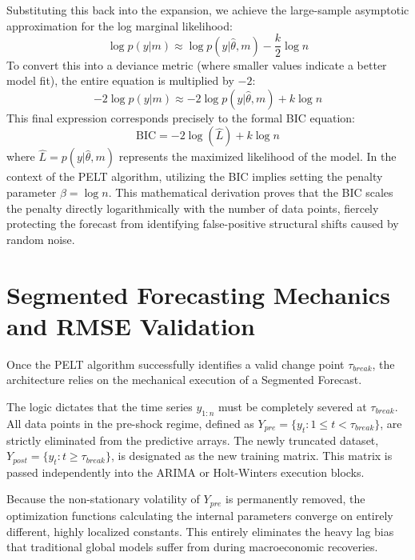Substituting this back into the expansion, we achieve the large-sample asymptotic approximation for the log marginal likelihood:
\begin{equation}
    \log p(y | m) \approx \log p(y | \hat{\theta}, m) - \frac{k}{2} \log n
\end{equation}
To convert this into a deviance metric (where smaller values indicate a better model fit), the entire equation is multiplied by $-2$:
\begin{equation}
    -2 \log p(y | m) \approx -2 \log p(y | \hat{\theta}, m) + k \log n
\end{equation}
This final expression corresponds precisely to the formal BIC equation:
\begin{equation}
    \text{BIC} = -2 \log(\hat{L}) + k \log n
\end{equation}
where $\hat{L} = p(y | \hat{\theta}, m)$ represents the maximized likelihood of the model. In the context of the PELT algorithm, utilizing the BIC implies setting the penalty parameter $\beta = \log n$. This mathematical derivation proves that the BIC scales the penalty directly logarithmically with the number of data points, fiercely protecting the forecast from identifying false-positive structural shifts caused by random noise.

\section{Segmented Forecasting Mechanics and RMSE Validation}
Once the PELT algorithm successfully identifies a valid change point $\tau_{break}$, the architecture relies on the mechanical execution of a Segmented Forecast.

The logic dictates that the time series $y_{1:n}$ must be completely severed at $\tau_{break}$. All data points in the pre-shock regime, defined as $Y_{pre} = \{y_t : 1 \le t < \tau_{break}\}$, are strictly eliminated from the predictive arrays. The newly truncated dataset, $Y_{post} = \{y_t : t \ge \tau_{break}\}$, is designated as the new training matrix. This matrix is passed independently into the ARIMA or Holt-Winters execution blocks. 

Because the non-stationary volatility of $Y_{pre}$ is permanently removed, the optimization functions calculating the internal parameters converge on entirely different, highly localized constants. This entirely eliminates the heavy lag bias that traditional global models suffer from during macroeconomic recoveries.

